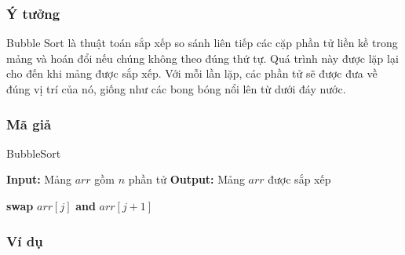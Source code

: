\subsubsection{Ý tưởng}
Bubble Sort là thuật toán sắp xếp so sánh liên tiếp các cặp phần tử liền kề trong mảng và hoán đổi nếu chúng không theo đúng thứ tự. Quá trình này được lặp lại cho đến khi mảng được sắp xếp. Với mỗi lần lặp, các phần tử sẽ được đưa về đúng vị trí của nó, giống như các bong bóng nổi lên từ dưới đáy nước. 
\subsubsection{Mã giả}

\begin{algorithm}[H]
\caption{BubbleSort}
\begin{algorithmic}[1]
    \State \textbf{Input:} Mảng $arr$ gồm $n$ phần tử
    \State \textbf{Output:} Mảng $arr$ được sắp xếp
    
                \State \textbf{swap} $arr[j]$ \textbf{and} $arr[j+1]$
            \EndIf
        \EndFor
    \EndFor
\EndProcedure
\end{algorithmic}
\end{algorithm}

\subsubsection{Ví dụ}

